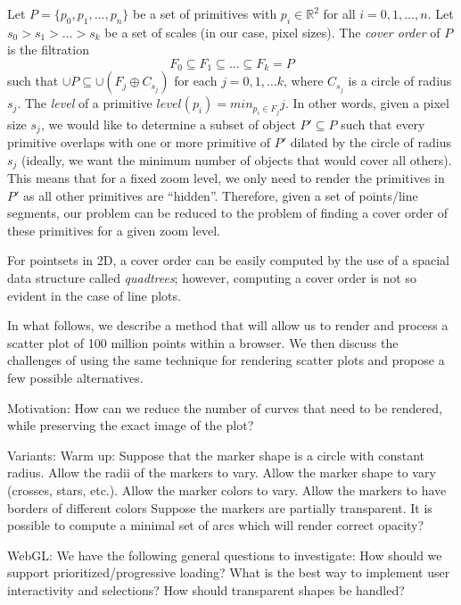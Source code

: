 \documentclass[11pt,a4paper]{article}
\begin{document}
Let $P=\{p_0, p_1, \dots, p_n\}$ be a set of primitives with $p_i \in \mathbb{R}^2$ for all $i=0,1,\dots,n$.
Let $s_0 > s_1 > \dots > s_k$ be a set of scales (in our case, pixel sizes).
The \emph{cover order} of $P$ is the filtration
$$F_0 \subseteq F_1 \subseteq \dots \subseteq F_k = P$$
such that $\cup P \subseteq \cup (F_j \oplus C_{s_j})$ for each $j = 0, 1,\dots k$, where $C_{s_j}$ is a circle of radius $s_j$.
The \emph{level} of a primitive $level(p_i) = \displaystyle min_{p_i \in F_j} j$.
In other words, given a pixel size $s_j$, we would like to determine a subset of object $P' \subseteq P$ such that 
every primitive overlaps with one or more primitive of $P'$ dilated by the circle of radius $s_j$ 
(ideally, we want the minimum number of objects that would cover all others). 
This means that for a fixed zoom level, we only need to render the primitives in $P'$ as all other primitives
are ``hidden''.
%
Therefore, given a set of points/line segments, our problem can be reduced to the problem of finding a cover
order of these primitives for a given zoom level.


For pointsets in 2D, a cover order can be easily computed by the use of a spacial data structure called \emph{quadtrees}; 
however, computing a cover order is not so evident in the case of line plots. %

In what follows, we describe a method that will allow us to render and process a scatter plot of 100 million points
within a browser. %
We then discuss the challenges of using the same technique for rendering scatter plots
and propose a few possible alternatives.

\iffalse
Motivation: How can we reduce the number of curves that need to be rendered, while preserving the exact image of the plot?

Variants:
Warm up: Suppose that the marker shape is a circle with constant radius.
Allow the radii of the markers to vary. 
Allow the marker shape to vary (crosses, stars, etc.). 
Allow the marker colors to vary.
Allow the markers to have borders of different colors
Suppose the markers are partially transparent. It is possible to compute a minimal set of arcs which will render correct opacity?

WebGL: We have the following general questions to investigate:
How should we support prioritized/progressive loading?
What is the best way to implement user interactivity and selections?
How should transparent shapes be handled?
\end{document}
